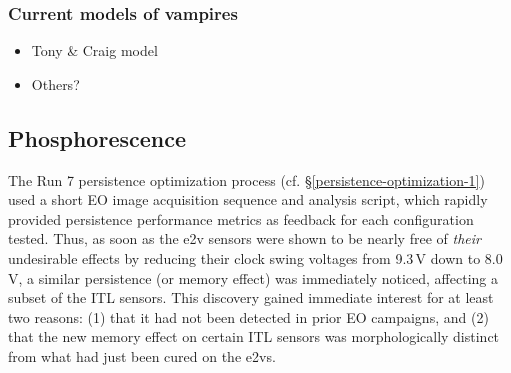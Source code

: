 \subsubsection{Current models of
vampires}\label{current-models-of-vampires}

\begin{itemize}
\tightlist
\item
  Tony \& Craig model
\item
  Others?
\end{itemize}



\subsection{Phosphorescence}\label{phosphorescence}

The Run 7 persistence optimization process (cf. \S\ref{persistence-optimization-1}) used a short EO image acquisition sequence and analysis script, which rapidly provided persistence performance metrics as feedback for each configuration tested. Thus, as soon as the e2v sensors were shown to be nearly free of {\it their} undesirable effects by reducing their clock swing voltages from 9.3\,V down to 8.0\,V, a similar persistence (or memory effect) was immediately noticed, affecting a subset of the ITL sensors. This discovery gained immediate interest for at least two reasons: (1) that it had not been detected in prior EO campaigns, and (2) that the new memory effect on certain ITL sensors was morphologically distinct from what had just been cured on the e2vs. 

